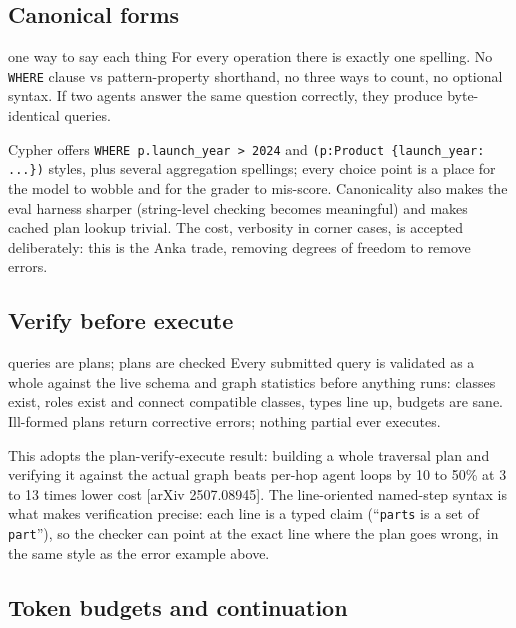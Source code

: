 \documentclass[11pt]{article}
\begin{document}
\subsection{Canonical forms}

\begin{featurebox}{one way to say each thing}
For every operation there is exactly one spelling. No \texttt{WHERE} clause vs pattern-property shorthand, no three ways to count, no optional syntax. If two agents answer the same question correctly, they produce byte-identical queries.
\end{featurebox}

Cypher offers \texttt{WHERE p.launch\_year > 2024} and \texttt{(p:Product \{launch\_year: ...\})} styles, plus several aggregation spellings; every choice point is a place for the model to wobble and for the grader to mis-score. Canonicality also makes the eval harness sharper (string-level checking becomes meaningful) and makes cached plan lookup trivial. The cost, verbosity in corner cases, is accepted deliberately: this is the Anka trade, removing degrees of freedom to remove errors.

\subsection{Verify before execute}

\begin{featurebox}{queries are plans; plans are checked}
Every submitted query is validated as a whole against the live schema and graph statistics before anything runs: classes exist, roles exist and connect compatible classes, types line up, budgets are sane. Ill-formed plans return corrective errors; nothing partial ever executes.
\end{featurebox}

This adopts the plan-verify-execute result: building a whole traversal plan and verifying it against the actual graph beats per-hop agent loops by 10 to 50\% at 3 to 13 times lower cost [arXiv 2507.08945]. The line-oriented named-step syntax is what makes verification precise: each line is a typed claim (``\texttt{parts} is a set of \texttt{part}''), so the checker can point at the exact line where the plan goes wrong, in the same style as the error example above.

\subsection{Token budgets and continuation}\label{sec:budget}
\end{document}
